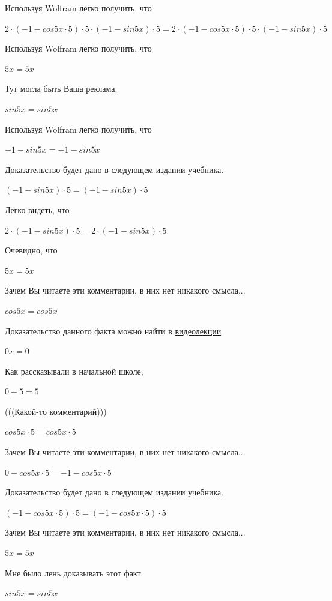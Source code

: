 \documentclass[12pt,a4paper,fleqn]{article}
\theoremstyle{definition}
\begin{document}
Используя Wolfram легко получить, что 

$ 2  \cdot ( -1  - cos 5  x  \cdot  5 ) \cdot  5  \cdot ( -1  - sin 5  x ) \cdot  5  =  2  \cdot ( -1  - cos 5  x  \cdot  5 ) \cdot  5  \cdot ( -1  - sin 5  x ) \cdot  5 $

Используя Wolfram легко получить, что 

$ 5  x  =  5  x $

Тут могла быть Ваша реклама. 

$sin 5  x  = sin 5  x $

Используя Wolfram легко получить, что 

$ -1  - sin 5  x  =  -1  - sin 5  x $

Доказательство будет дано в следующем издании учебника. 

$( -1  - sin 5  x ) \cdot  5  = ( -1  - sin 5  x ) \cdot  5 $

Легко видеть, что 

$ 2  \cdot ( -1  - sin 5  x ) \cdot  5  =  2  \cdot ( -1  - sin 5  x ) \cdot  5 $

Очевидно, что 

$ 5  x  =  5  x $

Зачем Вы читаете эти комментарии, в них нет никакого смысла... 

$cos 5  x  = cos 5  x $

Доказательство данного факта можно найти в \href{https://www.youtube.com/watch?v=dQw4w9WgXcQ}{видеолекции} 

$ 0  x  =  0 $

Как рассказывали в начальной школе, 

$ 0  +  5  =  5 $

(((Какой-то комментарий))) 

$cos 5  x  \cdot  5  = cos 5  x  \cdot  5 $

Зачем Вы читаете эти комментарии, в них нет никакого смысла... 

$ 0  - cos 5  x  \cdot  5  =  -1  - cos 5  x  \cdot  5 $

Доказательство будет дано в следующем издании учебника. 

$( -1  - cos 5  x  \cdot  5 ) \cdot  5  = ( -1  - cos 5  x  \cdot  5 ) \cdot  5 $

Зачем Вы читаете эти комментарии, в них нет никакого смысла... 

$ 5  x  =  5  x $

Мне было лень доказывать этот факт.

$sin 5  x  = sin 5  x $
\end{document}
